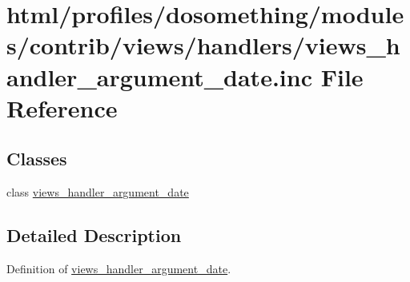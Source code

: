 \hypertarget{views__handler__argument__date_8inc}{
\section{html/profiles/dosomething/modules/contrib/views/handlers/views\_\-handler\_\-argument\_\-date.inc File Reference}
\label{views__handler__argument__date_8inc}
}
\subsection*{Classes}
\begin{DoxyCompactItemize}
\item 
class \hyperlink{classviews__handler__argument__date}{views\_\-handler\_\-argument\_\-date}
\end{DoxyCompactItemize}


\subsection{Detailed Description}
Definition of \hyperlink{classviews__handler__argument__date}{views\_\-handler\_\-argument\_\-date}. 